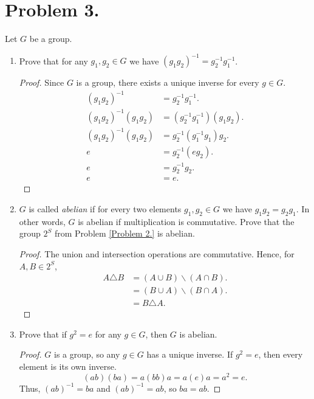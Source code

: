 \documentclass{article}
\begin{document}
\section{Problem 3.}
Let $G$ be a group.
\begin{enumerate}[label=(\alph*)]
    \item Prove that for any $g_1,g_2 \in G$ we have $(g_1g_2)^{-1}=g_2^{-1}g_1^{-1}$.
    \begin{proof}
    Since $G$ is a group, there exists a unique inverse for every $g\in G$.
    \begin{align*}
        (g_1g_2)^{-1}&=g_2^{-1}g_1^{-1}.\\
        (g_1g_2)^{-1}(g_1g_2)&=(g_2^{-1}g_1^{-1})(g_1g_2).\\
        (g_1g_2)^{-1}(g_1g_2)&=g_2^{-1}(g_1^{-1}g_1)g_2.\\
        e&=g_2^{-1}(eg_2).\\
        e&=g_2^{-1}g_2.\\
        e&=e.
    \end{align*}
    \end{proof}
    \item $G$ is called \textit{abelian} if for every two elements $g_1,g_2 \in G$ we have $g_1g_2=g_2g_1$. In other words, $G$ is abelian if multiplication is commutative. Prove that the group $2^S$ from Problem \ref{Problem 2.} is abelian.
    \begin{proof}
    The union and intersection operations are commutative. Hence, for $A,B\in 2^S$,
    \begin{align*}
        A\triangle B&=(A\cup B)\backslash(A\cap B).\\
        &=(B\cup A)\backslash(B\cap A).\\
        &=B\triangle A.
    \end{align*}
    \end{proof}
    \item Prove that if $g^2=e$ for any $g\in G$, then $G$ is abelian.
    \begin{proof}
    $G$ is a group, so any $g \in G$ has a unique inverse. If $g^2=e$, then every element is its own inverse.
    \[(ab)(ba)=a(bb)a=a(e)a=a^2=e.\]
    Thus, $(ab)^{-1} = ba$ and $(ab)^{-1}=ab$, so $ba=ab$.
    \end{proof}
\end{enumerate}
\end{document}
